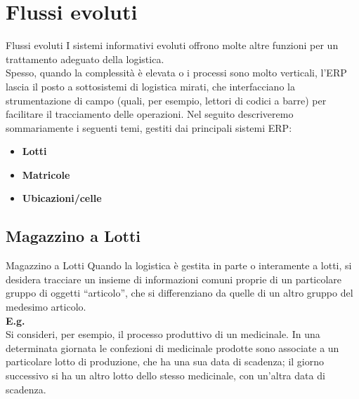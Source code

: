 \documentclass{beamer}
\begin{document}
\section{Flussi evoluti}
\begin{frame}{Flussi evoluti}
    I sistemi informativi evoluti offrono molte altre funzioni per un trattamento adeguato della logistica.\\
    Spesso, quando la complessità è elevata o i processi sono molto verticali, l’ERP lascia il posto a sottosistemi di logistica mirati, che interfacciano la strumentazione di campo (quali, per esempio, lettori di codici a barre) per facilitare il tracciamento delle operazioni. Nel seguito descriveremo sommariamente i seguenti temi, gestiti dai principali sistemi ERP:\\
    \begin{itemize}
        \item \textbf{Lotti}
        \item \textbf{Matricole}
        \item \textbf{Ubicazioni/celle}
    \end{itemize}
\end{frame}

\subsection{Magazzino a Lotti}
\begin{frame}{Magazzino a Lotti}
    Quando la logistica è gestita in parte o interamente a lotti, si desidera tracciare un insieme di informazioni comuni proprie di un particolare gruppo di oggetti “articolo”, che si differenziano da quelle di un altro gruppo del medesimo articolo.\\
    \vspace{1.5em}
    \textbf{E.g.}\\
    Si consideri, per esempio, il processo produttivo di un medicinale. In una determinata giornata le confezioni di medicinale prodotte sono associate a un particolare lotto di produzione, che ha una sua data di scadenza; il giorno successivo si ha un altro lotto dello stesso medicinale, con un’altra data di scadenza.
\end{frame}
\end{document}
